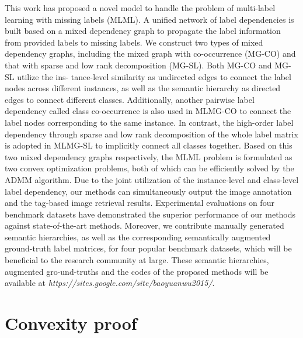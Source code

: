 \documentclass[twocolumn]{svjour3}          %
\begin{document}
This work has proposed a novel model to handle the problem of multi-label learning with missing labels (MLML). A unified network of label dependencies is built based on a mixed dependency graph to propagate the label information from provided labels to missing labels. 
We construct two types of mixed dependency graphs, including the mixed graph with co-occurrence (MG-CO) and that with sparse and low rank decomposition (MG-SL). 
Both MG-CO and MG-SL utilize the ins- tance-level similarity as undirected edges to connect the label nodes across different instances, as well as the semantic hierarchy as directed edges to connect different classes.
Additionally, another pairwise label dependency called class co-occurrence is also used in MLMG-CO to connect the label nodes corresponding to the same instance. 
In contrast, the high-order label dependency through sparse and low rank decomposition of the whole label matrix is adopted in MLMG-SL to implicitly connect all classes together. 
Based on this two mixed dependency graphs respectively, the MLML problem is formulated as two convex optimization problems, both of which can be efficiently solved by the ADMM algorithm. 
Due to the joint utilization of the instance-level and class-level label dependency, our methods can simultaneously output the image annotation and the tag-based image retrieval results. 
Experimental evaluations on four benchmark datasets have demonstrated the superior performance of our methods against state-of-the-art methods. Moreover, we contribute manually generated semantic hierarchies, as well as the corresponding semantically augmented ground-truth label matrices, for four popular benchmark datasets, which will be beneficial to the research community at large.
These semantic hierarchies, augmented gro-und-truths and the codes of the proposed methods will be available at {\it https://sites.google.com/site/baoyuanwu2015/}.



%
%
%
%
%
%
%
%
%
%
%
%
%
%
%


\appendix
%

\section{Convexity proof}
\label{sec1: convexity proof}
\end{document}
